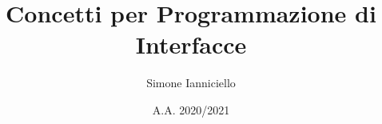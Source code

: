 \documentclass[a4paper,11pt,twoside]{book}
\begin{document}
\title{Concetti per Programmazione di Interfacce}
\author{Simone Ianniciello}
\date{A.A. 2020/2021}
\maketitle

\tableofcontents
\setcounter{chapter}{1}














\end{document}
